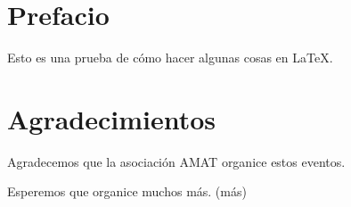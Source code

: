 
\chapter*{Prefacio}
Esto es una prueba de cómo hacer algunas cosas en LaTeX. 

\chapter*{Agradecimientos}
Agradecemos que la asociación AMAT organice estos eventos.

Esperemos que organice muchos más. (m\'as)